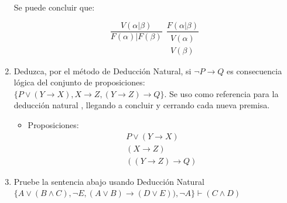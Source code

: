 \documentclass{article}
\begin{document}
\begin{enumerate}
		    Se puede concluir que:
		    
		    \begin{equation}
		        \frac{ V(\alpha | \beta)}{F(\alpha) |F(\beta)} \ \ \frac{F(\alpha | \beta)}{ \begin{matrix} V(\alpha)  \\  V(\beta) \end{matrix}}   
		    \end{equation}
		     

		
		
		
		\item Deduzca, por el método de Deducción Natural, si $\neg P \to Q$ es consecuencia lógica del conjunto de proposiciones: $\{ P \lor (Y \to X),X \to Z, (Y \to Z) \to Q \}$. Se uso como referencia para la deducción natural \cite{huth2004logic}, llegando a concluir y cerrando cada nueva premisa.
		    \begin{itemize}
    		     \item Proposiciones: 
    		     \begin{equation}
    		     \begin{aligned}
    		        P \vee (Y \rightarrow X)\\
    		        (X \rightarrow Z)\\
    		        ((Y \rightarrow Z) \rightarrow Q)
    		     \end{aligned}
    		     \end{equation}
    		 \end{itemize}
    		 
    		 \begin{prooftree}
    		 \end{prooftree}
		
		
		\item Pruebe la sentencia abajo usando Deducción Natural \\
		        $\{ A \lor (B \land C), \neg E, (A \lor B) \to (D \lor E)),\neg A \} \vdash (C \land D)$
		 

\end{enumerate}
\end{document}
